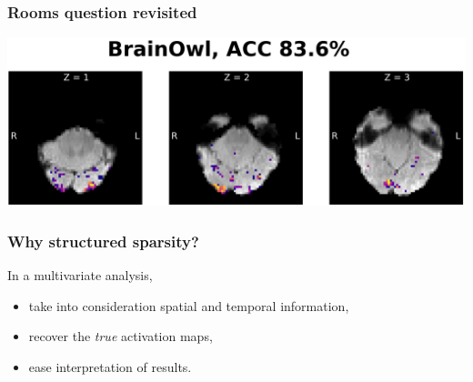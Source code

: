 \documentclass[11pt]{beamer}
\begin{document}
\begin{frame}
    \frametitle{Rooms question revisited}


    \begin{center}
        \includegraphics[scale=0.7]{figures/brainowl-axial.png}
    \end{center}
\end{frame}

\begin{frame}[t]
  \frametitle{Why structured sparsity?}
  In a multivariate analysis,
  \begin{itemize}
  \item take into consideration spatial and temporal information,
  \item recover the \emph{true} activation maps,
  \item ease interpretation of results.
  \end{itemize}
\end{frame}
\end{document}
